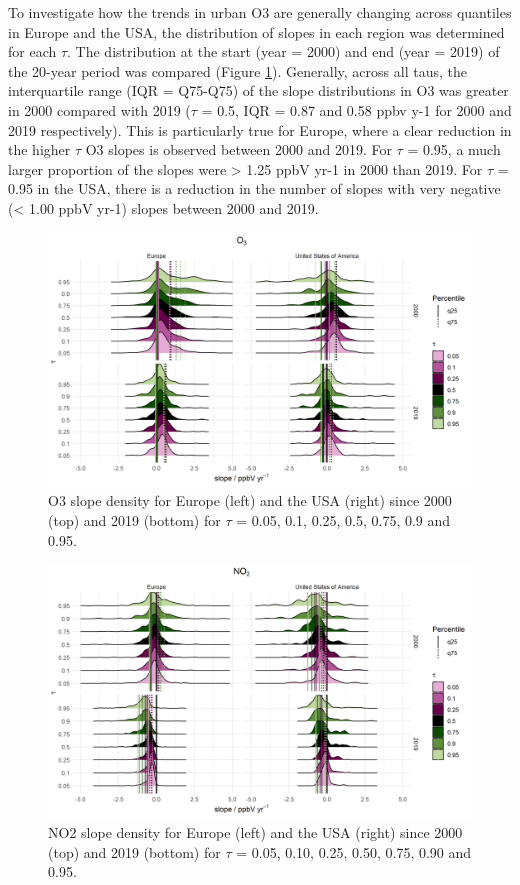 \documentclass[journal abbreviation, manuscript]{copernicus}
\begin{document}
To investigate how the trends in urban O3 are generally changing across quantiles in Europe and the USA, the distribution of slopes in each region was determined for each $\tau$. The distribution at the start (year = 2000) and end (year = 2019) of the 20-year period was compared (Figure \ref{o3_ridge_plot}). Generally, across all taus, the interquartile range (IQR = Q75-Q75) of the slope distributions in O3 was greater in 2000 compared with 2019 ($\tau$ = 0.5, IQR = 0.87 and 0.58 ppbv y-1 for 2000 and 2019 respectively). This is particularly true for Europe, where a clear reduction in the higher $\tau$ O3 slopes is observed between 2000 and 2019. For $\tau$ = 0.95, a much larger proportion of the slopes were > 1.25 ppbV yr-1 in 2000 than 2019. For $\tau$ = 0.95 in the USA, there is a reduction in the number of slopes with very negative (< 1.00 ppbV yr-1) slopes between 2000 and 2019.

\begin{figure}[h!]
\includegraphics[width=12cm]{plots/o3_density_ridges_by_tau_continent_2000_2019.png}
\caption{O3 slope density for Europe (left) and the USA (right) since 2000 (top) and 2019 (bottom) for $\tau$ = 0.05, 0.1, 0.25, 0.5, 0.75, 0.9 and 0.95.}
\label{o3_ridge_plot}
\end{figure}

\begin{figure}[h!]
\includegraphics[width=12cm]{plots/no2_density_ridges_by_tau_continent_2000_2019.png}
\caption{NO2 slope density for Europe (left) and the USA (right) since 2000 (top) and 2019 (bottom) for $\tau$ = 0.05, 0.10, 0.25, 0.50, 0.75, 0.90 and 0.95.}
\label{no2_ridge_plot}
\end{figure}
\end{document}
